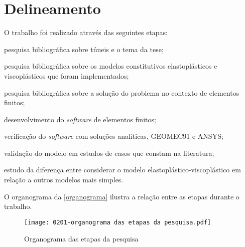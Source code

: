 \section{Delineamento}

O trabalho foi realizado através das seguintes etapas:

\begin{alineas}

	\item pesquisa bibliográfica sobre túneis e o tema da tese;
	
	\item pesquisa bibliográfica sobre os modelos constitutivos elastoplásticos e viscoplásticos que foram implementados;
	
	\item pesquisa bibliográfica sobre a solução do problema no contexto de elementos finitos;
	
	\item desenvolvimento do \textit{software} de elementos finitos;
	
	\item verificação do \textit{software} com soluções analíticas, GEOMEC91 e ANSYS;
	
	\item validação do modelo em estudos de casos que constam na literatura;
	
	\item estudo da diferença entre considerar o modelo elastoplástico-viscoplástico em relação a outros modelos mais simples.

\end{alineas}

O organograma da \autoref{organograma} ilustra a relação entre as etapas durante o trabalho.

\begin{figure}[H]
	\begin{center}
		\texttt{[image: 0201-organograma das etapas da pesquisa.pdf]}
	\end{center}
	\caption{\label{organograma} Organograma das etapas da pesquisa}
\end{figure}
